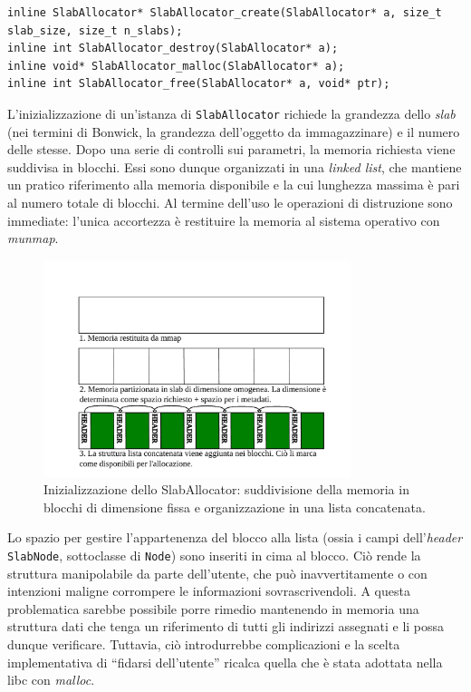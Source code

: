 \begin{lstlisting}
inline SlabAllocator* SlabAllocator_create(SlabAllocator* a, size_t slab_size, size_t n_slabs);
inline int SlabAllocator_destroy(SlabAllocator* a);
inline void* SlabAllocator_malloc(SlabAllocator* a);
inline int SlabAllocator_free(SlabAllocator* a, void* ptr);
\end{lstlisting}

L’inizializzazione di un’istanza di \texttt{SlabAllocator} richiede la grandezza dello \textit{slab} (nei termini di Bonwick, la grandezza dell’oggetto da immagazzinare) e il numero delle stesse. Dopo una serie di controlli sui parametri, la memoria richiesta viene suddivisa in blocchi. Essi sono dunque organizzati in una \textit{linked list}, che mantiene un pratico riferimento alla memoria disponibile e la cui lunghezza massima è pari al numero totale di blocchi. Al termine dell’uso le operazioni di distruzione sono immediate: l’unica accortezza è restituire la memoria al sistema operativo con \textit{munmap}.

\begin{figure}[H]
    \centering
    \includegraphics[width=0.8\textwidth]{images/slab/slab_allocator_init.pdf}
    \caption{Inizializzazione dello SlabAllocator: suddivisione della memoria in blocchi di dimensione fissa e organizzazione in una lista concatenata.}
    \label{fig:slab_allocator_init}
\end{figure}

Lo spazio per gestire l’appartenenza del blocco alla lista (ossia i campi dell'\textit{header} \texttt{SlabNode}, sottoclasse di \texttt{Node}) sono inseriti in cima al blocco. Ciò rende la struttura manipolabile da parte dell’utente, che può inavvertitamente o con intenzioni maligne corrompere le informazioni sovrascrivendoli. A questa problematica sarebbe possibile porre rimedio mantenendo in memoria una struttura dati che tenga un riferimento di tutti gli indirizzi assegnati e li possa dunque verificare. Tuttavia, ciò introdurrebbe complicazioni e la scelta implementativa di “fidarsi dell’utente” ricalca quella che è stata adottata nella libc con \textit{malloc}.


